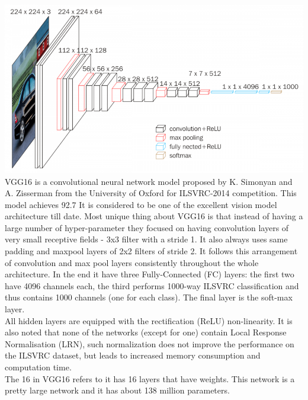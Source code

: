 \includegraphics[scale=0.5]{images/modelOne/vgg16.png}
VGG16 is a convolutional neural network model proposed by K. Simonyan and A. Zisserman from the University of Oxford for ILSVRC-2014 competition. This model achieves 92.7%
It is considered to be one of the excellent vision model architecture till date. Most unique thing about VGG16 is that instead of having a large number of hyper-parameter they focused on having convolution layers of very small receptive fields - 3x3 filter with a stride 1. It also always uses same padding and maxpool layers of 2x2 filters of stride 2. It follows this arrangement of convolution and max pool layers consistently throughout the whole architecture. In the end it have three Fully-Connected (FC) layers: the first two have 4096 channels each, the third performs 1000-way ILSVRC classification and thus contains 1000 channels (one for each class). The final layer is the soft-max layer. \\
All hidden layers are equipped with the rectification (ReLU) non-linearity. It is also noted that none of the networks (except for one) contain Local Response Normalisation (LRN), such normalization does not improve the performance on the ILSVRC dataset, but leads to increased memory consumption and computation time.\\
The 16 in VGG16 refers to it has 16 layers that have weights. This network is a pretty large network and it has about 138 million parameters.
